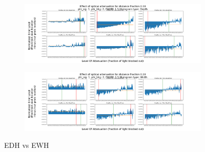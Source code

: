 \documentclass[aspectratio=169]{beamer}
\begin{document}
\begin{frame}
  \begin{figure}[H]
    \centering
    \begin{subfigure}[b]{0.75\textwidth}
      \includegraphics[width=1\linewidth]{depthExample.png}
      \label{fig:Depth Example}
    \end{subfigure}
    \begin{subfigure}[b]{0.75\textwidth}
      \includegraphics[width=1\linewidth]{widthExample.png}
      \label{fig:Width Example}
    \end{subfigure}
    \caption{\label{fig:histogramComparison}\color{Blue}EDH vs EWH}
  \end{figure}
\end{frame}
\end{document}

